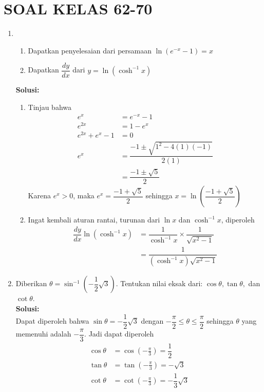 \documentclass{article}
\begin{document}
\section*{SOAL KELAS 62-70}
\begin{enumerate}
	\item \begin{enumerate}
		\item Dapatkan penyelesaian dari persamaan $\ln(e^{-x}-1)=x$
		\item Dapatkan $\dfrac{dy}{dx}$ dari $y=\ln(\cosh^{-1}x)$
	\end{enumerate}
	\textbf{Solusi:}
	\begin{enumerate}
		\item Tinjau bahwa 
		\begin{align*}
		e^x &= e^{-x}-1\\
		e^{2x} &= 1-e^x\\
		e^{2x}+e^x-1 &= 0 \\
		e^x &= \dfrac{-1\pm \sqrt{1^2-4(1)(-1)}}{2(1)} \\
		&= \dfrac{-1\pm\sqrt{5}}{2}
		\end{align*}
		Karena $e^x>0$, maka $e^x=\dfrac{-1+\sqrt{5}}{2}$ sehingga $x=\ln \left(\dfrac{-1+\sqrt{5}}{2}\right)$
		\item Ingat kembali aturan rantai, turunan dari $\ln x$ dan $\cosh^{-1}x$, diperoleh 
		\begin{align*}
		\dfrac{dy}{dx}\ln(\cosh^{-1}x) &= \dfrac{1}{\cosh^{-1}x}\times \dfrac{1}{\sqrt{x^2-1}}\\
		&= \dfrac{1}{(\cosh^{-1}x)\sqrt{x^2-1}}
		\end{align*}
	\end{enumerate}
	\item Diberikan $\theta=\sin^{-1}\left(-\dfrac{1}{2}\sqrt{3}\right)$. Tentukan nilai eksak dari: $\cos\theta,\tan\theta,$ dan $\cot\theta$.\\
	\textbf{Solusi:}\\
	Dapat diperoleh bahwa $\sin\theta=-\dfrac{1}{2}\sqrt{3}$ dengan $-\dfrac{\pi}{2}\leq\theta\leq\dfrac{\pi}{2}$ sehingga $\theta$ yang memenuhi adalah $-\dfrac{\pi}{3}$. Jadi dapat diperoleh 
	\begin{align*}
	\cos\theta &= \cos \left(-\frac{\pi}{3}\right) = \dfrac{1}{2}\\
	\tan\theta &= \tan \left(-\frac{\pi}{3}\right) = -\sqrt{3}\\
	\cot\theta &= \cot \left(-\frac{\pi}{3}\right) = -\dfrac{1}{3}\sqrt{3}
	\end{align*}

\end{enumerate}
\end{document}
